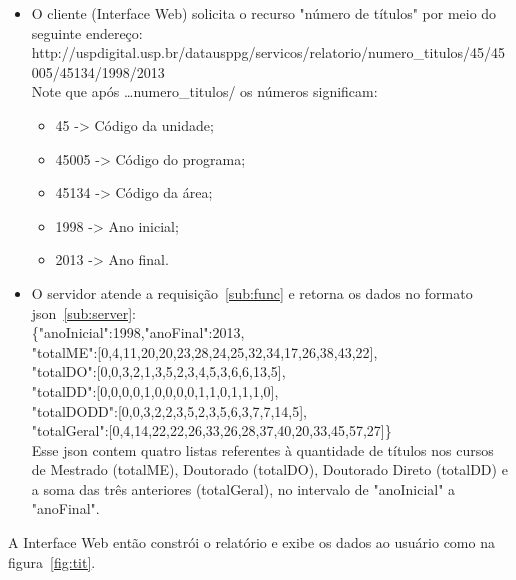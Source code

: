 \begin{itemize}
\item{O cliente (Interface Web) solicita o recurso "número de títulos" por meio do seguinte endereço:} \hfill 
\\[2ex]
\scriptsize{http://uspdigital.usp.br/datausppg/servicos/relatorio/numero\_titulos/45/45005/45134/1998/2013}
\\[4ex]
\normalsize Note que após \dots numero\_titulos/ os números significam:
    \begin{itemize}
        \item 45 -> Código da unidade;
        \item 45005 -> Código do programa;
        \item 45134 -> Código da área;
        \item 1998 -> Ano inicial;
        \item 2013 -> Ano final.
    \end{itemize}
 \item{O servidor atende a requisição~\ref{sub:func} e retorna os dados no formato json~\ref{sub:server}:} \hfill 
\\[3ex]
\scriptsize{\{"anoInicial":1998,"anoFinal":2013,\\
"totalME":[0,4,11,20,20,23,28,24,25,32,34,17,26,38,43,22],\\
"totalDO":[0,0,3,2,1,3,5,2,3,4,5,3,6,6,13,5],\\
"totalDD":[0,0,0,0,1,0,0,0,0,1,1,0,1,1,1,0],\\
"totalDODD":[0,0,3,2,2,3,5,2,3,5,6,3,7,7,14,5],\\
"totalGeral":[0,4,14,22,22,26,33,26,28,37,40,20,33,45,57,27]\}}
\\[6ex]
\normalsize Esse json contem quatro listas referentes à quantidade de títulos nos cursos de Mestrado (totalME),
 Doutorado (totalDO), Doutorado Direto (totalDD) e a soma das três anteriores (totalGeral), no intervalo de "anoInicial" a "anoFinal".
\end{itemize}
A Interface Web então constrói o relatório e exibe os dados ao usuário como na figura~\ref{fig:tit}. 
